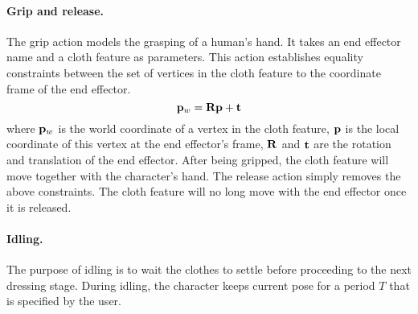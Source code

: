 \paragraph{Grip and release.}
The grip action models the grasping of a human's hand. It takes an end effector name and a cloth feature as parameters. This action establishes equality constraints between the set of vertices in the cloth feature to the coordinate frame of the end effector.
\begin{displaymath}
\mathbf{p}_w = \mathbf{Rp} + \mathbf{t}
\end{displaymath}
where $\mathbf{p}_w$ is the world coordinate of a vertex in the cloth feature, $\mathbf{p}$ is the local coordinate of this vertex at the end effector's frame, $\mathbf{R}$ and $\mathbf{t}$ are the rotation and translation of the end effector. After being gripped, the cloth feature will move together with the character's hand. The release action simply removes the above constraints. The cloth feature will no long move with the end effector once it is released.

\paragraph{Idling.} The purpose of idling is to wait the clothes to settle before proceeding to the next dressing stage. During idling, the character keeps current pose for a period $T$ that is specified by the user.

